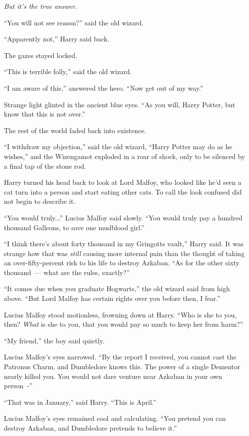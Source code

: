 \emph{But it's the true answer.}

``You will not see reason?'' said the old wizard.

``Apparently not,'' Harry said back.

The gazes stayed locked.

``This is terrible folly,'' said the old wizard.

``I am aware of this,'' answered the hero. ``Now get out of my way.''

Strange light glinted in the ancient blue eyes. ``As you will, Harry Potter, but know that this is not over.''

The rest of the world faded back into existence.

``I withdraw my objection,'' said the old wizard, ``Harry Potter may do as he wishes,'' and the Wizengamot exploded in a roar of shock, only to be silenced by a final tap of the stone rod.

Harry turned his head back to look at Lord Malfoy, who looked like he'd seen a cat turn into a person and start eating other cats. To call the look confused did not begin to describe it.

``You would truly...'' Lucius Malfoy said slowly. ``You would truly pay a hundred thousand Galleons, to save one mudblood girl.''

``I think there's about forty thousand in my Gringotts vault,'' Harry said. It was strange how that was \emph{still} causing more internal pain than the thought of taking an over-fifty-percent risk to his life to destroy Azkaban. ``As for the other sixty thousand~--- what are the rules, exactly?''

``It comes due when you graduate Hogwarts,'' the old wizard said from high above. ``But Lord Malfoy has certain rights over you before then, I fear.''

Lucius Malfoy stood motionless, frowning down at Harry. ``Who is she to you, then? \emph{What} is she to you, that you would pay so much to keep her from harm?''

``My friend,'' the boy said quietly.

Lucius Malfoy's eyes narrowed. ``By the report I received, you cannot cast the Patronus Charm, and Dumbledore knows this. The power of a single Dementor nearly killed you. You would not dare venture near Azkaban in your own person~-''

``That was in January,'' said Harry. ``This is April.''

Lucius Malfoy's eyes remained cool and calculating. ``You pretend you can destroy Azkaban, and Dumbledore pretends to believe it.''

